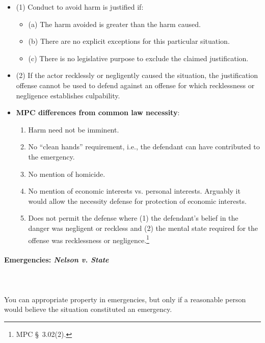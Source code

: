 \begin{itemize}
    \item (1) Conduct to avoid harm is justified if:
    \begin{itemize}
        \item (a) The harm avoided is greater than the harm caused.
        \item (b) There are no explicit exceptions for this particular 
        situation.
        \item (c) There is no legislative purpose to exclude the claimed 
        justification.
    \end{itemize}
    \item (2) If the actor recklessly or negligently caused the situation, the 
    justification offense cannot be used to defend against an offense for 
    which recklessness or negligence establishes culpability.
    \item \textbf{MPC differences from common law necessity}:
    \begin{enumerate}
        \item Harm need not be imminent.
        \item No ``clean hands'' requirement, i.e., the defendant can have contributed to the emergency.
        \item No mention of homicide.
        \item No mention of economic interests vs. personal interests. 
        Arguably it would allow the necessity defense for protection of 
        economic interests.
        \item Does not permit the defense where (1) the defendant's belief in the 
        danger was negligent or reckless and (2) the mental state required for 
        the offense was recklessness or negligence.\footnote{MPC \S\ 3.02(2).}
    \end{enumerate}
\end{itemize}

\paragraph{Emergencies: \emph{Nelson v. State}}
~\\\\
You can appropriate property in emergencies, but only if a reasonable person 
would believe the situation constituted an emergency.

